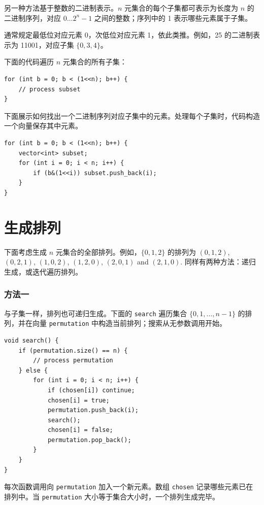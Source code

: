 另一种方法基于整数的二进制表示。$n$ 元集合的每个子集都可表示为长度为 $n$ 的二进制序列，对应 $0 \ldots 2^n-1$ 之间的整数；序列中的 1 表示哪些元素属于子集。

通常规定最低位对应元素 0，次低位对应元素 1，依此类推。例如，25 的二进制表示为 11001，对应子集 $\{0,3,4\}$。

下面的代码遍历 $n$ 元集合的所有子集：

\begin{lstlisting}
for (int b = 0; b < (1<<n); b++) {
    // process subset
}
\end{lstlisting}

下面展示如何找出一个二进制序列对应子集中的元素。处理每个子集时，代码构造一个向量保存其中元素。

\begin{lstlisting}
for (int b = 0; b < (1<<n); b++) {
    vector<int> subset;
    for (int i = 0; i < n; i++) {
        if (b&(1<<i)) subset.push_back(i);
    }
}
\end{lstlisting}

\section{生成排列}


下面考虑生成 $n$ 元集合的全部排列。例如，$\{0,1,2\}$ 的排列为
$(0,1,2)$, $(0,2,1)$, $(1,0,2)$, $(1,2,0)$,
$(2,0,1)$ and $(2,1,0)$.
同样有两种方法：递归生成，或迭代遍历排列。

\subsubsection{方法一}

与子集一样，排列也可递归生成。下面的 \texttt{search} 遍历集合 $\{0,1,\ldots,n-1\}$ 的排列，并在向量 \texttt{permutation} 中构造当前排列；搜索从无参数调用开始。

\begin{lstlisting}
void search() {
    if (permutation.size() == n) {
        // process permutation
    } else {
        for (int i = 0; i < n; i++) {
            if (chosen[i]) continue;
            chosen[i] = true;
            permutation.push_back(i);
            search();
            chosen[i] = false;
            permutation.pop_back();
        }
    }
}
\end{lstlisting}

每次函数调用向 \texttt{permutation} 加入一个新元素。数组 \texttt{chosen} 记录哪些元素已在排列中。当 \texttt{permutation} 大小等于集合大小时，一个排列生成完毕。

